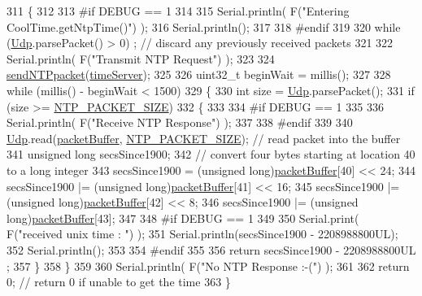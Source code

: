 \begin{DoxyCode}
311 \{
312 
313 \textcolor{preprocessor}{#if DEBUG == 1 }
314 
315     Serial.println( F(\textcolor{stringliteral}{"Entering CoolTime.getNtpTime()"}) );
316     Serial.println();
317 
318 \textcolor{preprocessor}{#endif }
319 
320     \textcolor{keywordflow}{while} (\hyperlink{class_cool_time_a4e23216a8121ca79d0fb019f30884b92}{Udp}.parsePacket() > 0) ; \textcolor{comment}{// discard any previously received packets}
321 
322     Serial.println( F(\textcolor{stringliteral}{"Transmit NTP Request"}) );
323 
324     \hyperlink{class_cool_time_a236a38d120dc53bc67456d763838c5a1}{sendNTPpacket}(\hyperlink{class_cool_time_ad2b9858f399108cb440dd1e908916f04}{timeServer});
325 
326     uint32\_t beginWait = millis();
327 
328     \textcolor{keywordflow}{while} (millis() - beginWait < 1500) 
329     \{
330         \textcolor{keywordtype}{int} size = \hyperlink{class_cool_time_a4e23216a8121ca79d0fb019f30884b92}{Udp}.parsePacket();
331         \textcolor{keywordflow}{if} (size >= \hyperlink{_cool_time_8h_a56a6ea64006651b4f42adf713e244f06}{NTP\_PACKET\_SIZE}) 
332         \{
333         
334 \textcolor{preprocessor}{        #if DEBUG == 1}
335 
336             Serial.println( F(\textcolor{stringliteral}{"Receive NTP Response"}) );
337         
338 \textcolor{preprocessor}{        #endif}
339 
340             \hyperlink{class_cool_time_a4e23216a8121ca79d0fb019f30884b92}{Udp}.read(\hyperlink{class_cool_time_a27e6abc82a5c2f72161956967005bec7}{packetBuffer}, \hyperlink{_cool_time_8h_a56a6ea64006651b4f42adf713e244f06}{NTP\_PACKET\_SIZE});  \textcolor{comment}{// read packet into the
       buffer}
341             \textcolor{keywordtype}{unsigned} \textcolor{keywordtype}{long} secsSince1900;
342             \textcolor{comment}{// convert four bytes starting at location 40 to a long integer}
343             secsSince1900 =  (\textcolor{keywordtype}{unsigned} long)\hyperlink{class_cool_time_a27e6abc82a5c2f72161956967005bec7}{packetBuffer}[40] << 24;
344             secsSince1900 |= (\textcolor{keywordtype}{unsigned} long)\hyperlink{class_cool_time_a27e6abc82a5c2f72161956967005bec7}{packetBuffer}[41] << 16;
345             secsSince1900 |= (\textcolor{keywordtype}{unsigned} long)\hyperlink{class_cool_time_a27e6abc82a5c2f72161956967005bec7}{packetBuffer}[42] << 8;
346             secsSince1900 |= (\textcolor{keywordtype}{unsigned} long)\hyperlink{class_cool_time_a27e6abc82a5c2f72161956967005bec7}{packetBuffer}[43];
347         
348 \textcolor{preprocessor}{        #if DEBUG == 1 }
349     
350             Serial.print( F(\textcolor{stringliteral}{"received unix time : "}) );
351             Serial.println(secsSince1900 - 2208988800UL);
352             Serial.println();
353 
354 \textcolor{preprocessor}{        #endif }
355 
356             \textcolor{keywordflow}{return} secsSince1900 - 2208988800UL ;
357         \}
358     \}
359     
360     Serial.println( F(\textcolor{stringliteral}{"No NTP Response :-("}) );
361 
362     \textcolor{keywordflow}{return} 0; \textcolor{comment}{// return 0 if unable to get the time}
363 \}
\end{DoxyCode}
